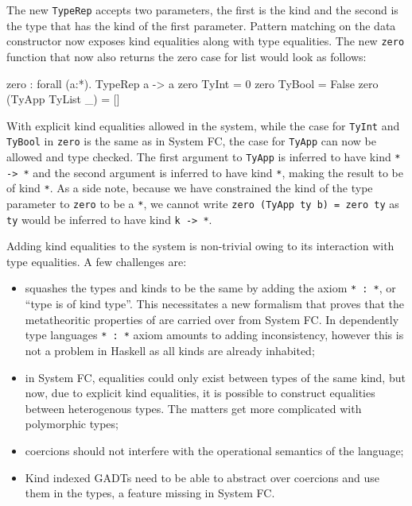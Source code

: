 \documentclass[manuscript,screen,nonacm]{acmart}
\begin{document}
The new \lstinline{TypeRep} accepts two parameters, the first is the kind and the second is the type that has the kind of the first parameter. Pattern matching on the data constructor now exposes kind equalities along with type equalities. The new \lstinline{zero} function that now also returns the zero case for list would look as follows:
\begin{codef}
  zero : forall (a:*). TypeRep a -> a
  zero TyInt            = 0
  zero TyBool           = False
  zero (TyApp TyList _) = []
\end{codef}
With explicit kind equalities allowed in the system, while the case for \lstinline{TyInt} and \lstinline{TyBool} in \lstinline{zero} is the same as in System FC, the case for \lstinline{TyApp} can now be allowed and type checked. The first argument to \lstinline{TyApp} is inferred to have kind \lstinline{* -> *} and the second argument is inferred to have kind \lstinline{*}, making the result to be of kind \lstinline{*}. As a side note, because we have constrained the kind of the type parameter to \lstinline{zero} to be a \lstinline{*}, we cannot write \lstinline{zero (TyApp ty b) = zero ty} as \lstinline{ty} would be inferred to have kind \lstinline{k -> *}.

Adding kind equalities to the system is non-trivial owing to its interaction with type equalities. A few challenges are:
\begin{itemize}
\item \SFK squashes the types and kinds to be the same by adding the axiom \lstinline{* : *}, or ``type is of kind type''. This necessitates a new formalism that proves that the metatheoritic properties of \SFK are carried over from System FC. In dependently type languages \lstinline{* : *} axiom amounts to adding inconsistency, however this is not a problem in Haskell as all kinds are already inhabited;
\item in System FC, equalities could only exist between types of the same kind, but now, due to explicit kind equalities, it is possible to construct equalities between heterogenous types. The matters get more complicated with polymorphic types;
\item coercions should not interfere with the operational semantics of the language;
\item Kind indexed GADTs need to be able to abstract over coercions and use them in the types, a feature missing in System FC. 
\end{itemize}
\end{document}
